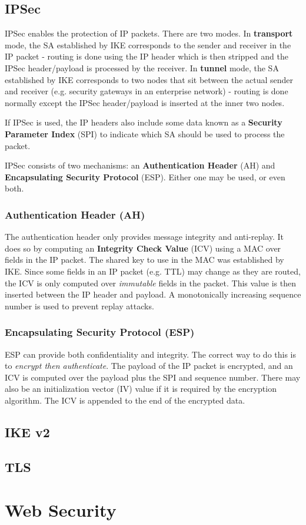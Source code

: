\documentclass[11pt]{report}
\begin{document}
\section{IPSec}
IPSec enables the protection of IP packets. There are two modes. In \textbf{transport} mode, the SA established by IKE corresponds to the sender and receiver in the IP packet - routing is done using the IP header which is then stripped and the IPSec header/payload is processed by the receiver. In \textbf{tunnel} mode, the SA established by IKE corresponds to two nodes that sit between the actual sender and receiver (e.g. security gateways in an enterprise network) - routing is done normally except the IPSec header/payload is inserted at the inner two nodes.

If IPSec is used, the IP headers also include some data known as a \textbf{Security Parameter Index} (SPI) to indicate which SA should be used to process the packet.

IPSec consists of two mechanisms: an \textbf{Authentication Header} (AH) and \textbf{Encapsulating Security Protocol} (ESP). Either one may be used, or even both.

\subsection{Authentication Header (AH)}
The authentication header only provides message integrity and anti-replay. It does so by computing an \textbf{Integrity Check Value} (ICV) using a MAC over fields in the IP packet. The shared key to use in the MAC was established by IKE. Since some fields in an IP packet (e.g. TTL) may change as they are routed, the ICV is only computed over \textit{immutable} fields in the packet. This value is then inserted between the IP header and payload. A monotonically increasing sequence number is used to prevent replay attacks.

\subsection{Encapsulating Security Protocol (ESP)}
ESP can provide both confidentiality and integrity. The correct way to do this is to \textit{encrypt then authenticate}. The payload of the IP packet is encrypted, and an ICV is computed over the payload plus the SPI and sequence number. There may also be an initialization vector (IV) value if it is required by the encryption algorithm. The ICV is appended to the end of the encrypted data.


\section{IKE v2}


\section{TLS}


\chapter{Web Security}
\end{document}
